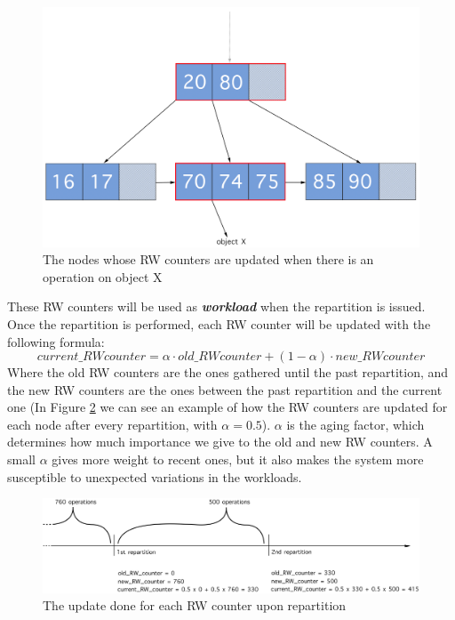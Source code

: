 \begin{figure}[!htb]
  \centering
  \includegraphics[width=\textwidth,height=\textheight,keepaspectratio]{img/B+tree_path.png}
  \caption{ The nodes whose RW counters are updated when there is an operation on object X }
  \label{fig:B+tree_path}
\end{figure}

These RW counters will be used as \textbf{\emph{workload}} when the repartition is issued. Once the repartition is performed, each RW counter will be updated with the following formula:
$$ current\_RW counter = \alpha \cdot old\_RW counter + (1-\alpha) \cdot new\_RW counter $$
Where the old RW counters are the ones gathered until the past repartition, and the new RW counters are the ones between the past repartition and the current one (In Figure \ref{fig:RW counters} we can see an example of how the RW counters are updated for each node after every repartition, with $\alpha = 0.5$).
$\alpha$ is the aging factor, which determines how much importance we give to the old and new RW counters. A small $\alpha$ gives more weight to recent ones, but it also makes the system more susceptible to unexpected variations in the workloads.

\begin{figure}[!htb]
  \centering
  \includegraphics[width=\textwidth,height=\textheight,keepaspectratio]{img/RW_counters.png}
  \caption{ The update done for each RW counter upon repartition }
  \label{fig:RW counters}
\end{figure}

